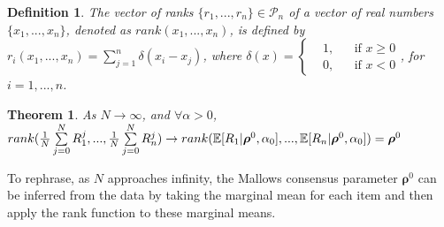 \documentclass[11pt, oneside]{article}   	%
\newtheorem{theorem}{Theorem}[subsection]
\newtheorem{mydef}{Definition}
\begin{document}
\begin{mydef}
The vector of ranks $\{r_1, ..., r_n \}  \in \mathcal{P}_n$ of a vector of real numbers $\{x_1, ..., x_n \}$, denoted as $rank(x_1, ..., x_n)$, is defined by $r_i(x_1, ..., x_n) = \sum\limits_{j=1}^{n}\delta (x_i - x_j)$, where 
$
\delta(x) = \left \{
\begin{aligned}
&1, && \text{if } x\geq 0 \\
&0, && \text{if } x < 0
\end{aligned} \right.
$, for $i = 1, ..., n$.
\end{mydef} 
\begin{theorem}\label{theorem:inferrho}
As $N \rightarrow \infty$, and $\forall \alpha > 0$, \\ $rank({1\over N}\sum\limits_{j=0}^{N}R_1^j,...,{1\over N}\sum\limits_{j=0}^{N}R_n^j) \rightarrow rank(\mathbb{E}[{R}_1|\bm{\rho}^0, \alpha_0],...,\mathbb{E}[{R}_n|\bm{\rho}^0, \alpha_0]) =\bm{\rho}^0 $
\end{theorem}

To rephrase, as $N$ approaches infinity, the Mallows consensus parameter $\bm{\rho}^0$ can be inferred from the data by taking the marginal mean for each item and then apply the rank function to these marginal means.
\end{document}
